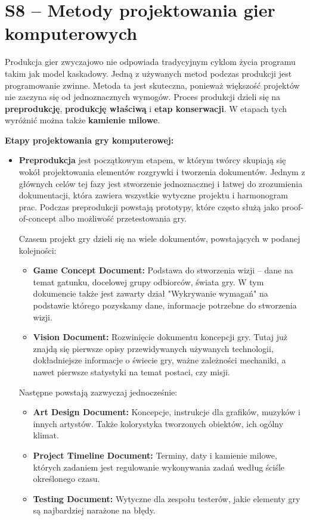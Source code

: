 \section{S8 -- Metody projektowania gier komputerowych}

Produkcja gier zwyczajowo nie odpowiada tradycyjnym cyklom życia programu takim jak model kaskadowy. Jedną z używanych metod podczas produkcji jest programowanie zwinne. Metoda ta jest skuteczna, ponieważ większość projektów nie zaczyna się od jednoznacznych wymogów. Proces produkcji dzieli się na \textbf{preprodukcję}, \textbf{produkcję właściwą} i \textbf{etap konserwacji}. W etapach tych wyróżnić można także \textbf{kamienie milowe}.

\textbf{Etapy projektowania gry komputerowej:}

\begin{itemize}
	\setlength\itemsep{1pt}
	\item \textbf{Preprodukcja} jest początkowym etapem, w którym twórcy skupiają się wokół projektowania elementów rozgrywki i tworzenia dokumentów. Jednym z głównych celów tej fazy jest stworzenie jednoznacznej i łatwej do zrozumienia dokumentacji, która zawiera wszystkie wytyczne projektu i harmonogram prac. Podczas preprodukcji powstają prototypy, które często służą jako proof-of-concept albo możliwość przetestowania gry.
	
	Czasem projekt gry dzieli się na wiele dokumentów, powstających w podanej kolejności:
	
	\begin{itemize}
		\setlength\itemsep{1pt}
		\item \textbf{Game Concept Document:} Podstawa do stworzenia wizji – dane na temat gatunku, docelowej grupy odbiorców, świata gry. W tym dokumencie także jest zawarty dział "Wykrywanie wymagań" na podstawie którego pozyskamy dane, informacje potrzebne do stworzenia wizji.
		\item \textbf{Vision Document:} Rozwinięcie dokumentu koncepcji gry. Tutaj już znajdą się pierwsze opisy przewidywanych używanych technologii, dokładniejsze informacje o świecie gry, ważne zależności mechaniki, a nawet pierwsze statystyki na temat postaci, czy misji.
	\end{itemize}
	
	Następne powstają zazwyczaj jednocześnie:
	
	\begin{itemize}
		\setlength\itemsep{1pt}
		\item \textbf{Art Design Document:} Koncepcje, instrukcje dla grafików, muzyków i innych artystów. Także kolorystyka tworzonych obiektów, ich ogólny klimat.
		\item \textbf{Project Timeline Document:} Terminy, daty i kamienie milowe, których zadaniem jest regulowanie wykonywania zadań według ściśle określonego czasu.
		\item \textbf{Testing Document:} Wytyczne dla zespołu testerów, jakie elementy gry są najbardziej narażone na błędy.
	\end{itemize}
	

\end{itemize}

